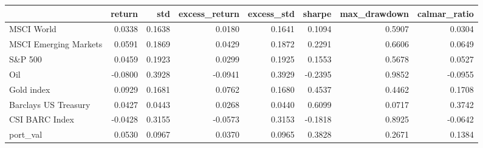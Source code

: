 \begin{tabular}{lrrrrrrr}
\toprule
{} &  return &     std &  excess\_return &  excess\_std &  sharpe &  max\_drawdown &  calmar\_ratio \\
\midrule
MSCI World            &  0.0338 &  0.1638 &         0.0180 &      0.1641 &  0.1094 &        0.5907 &        0.0304 \\
MSCI Emerging Markets &  0.0591 &  0.1869 &         0.0429 &      0.1872 &  0.2291 &        0.6606 &        0.0649 \\
S\&P 500               &  0.0459 &  0.1923 &         0.0299 &      0.1925 &  0.1553 &        0.5678 &        0.0527 \\
Oil                   & -0.0800 &  0.3928 &        -0.0941 &      0.3929 & -0.2395 &        0.9852 &       -0.0955 \\
Gold index            &  0.0929 &  0.1681 &         0.0762 &      0.1680 &  0.4537 &        0.4462 &        0.1708 \\
Barclays US Treasury  &  0.0427 &  0.0443 &         0.0268 &      0.0440 &  0.6099 &        0.0717 &        0.3742 \\
CSI BARC Index        & -0.0428 &  0.3155 &        -0.0573 &      0.3153 & -0.1818 &        0.8925 &       -0.0642 \\
port\_val              &  0.0530 &  0.0967 &         0.0370 &      0.0965 &  0.3828 &        0.2671 &        0.1384 \\
\bottomrule
\end{tabular}
